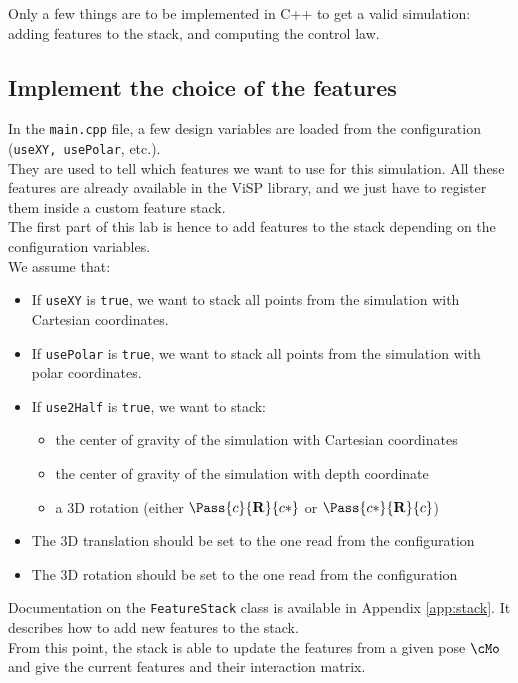 \documentclass{ecnreport}
\begin{document}
Only a few things are to be implemented in C++ to get a valid simulation: adding features to the stack, and computing the control law.

\subsection{Implement the choice of the features}

In the \texttt{main.cpp} file, a few design variables are loaded from the configuration (\texttt{useXY, usePolar}, etc.).\\

They are used to tell which features we want to use for this simulation. All these features are already available in the ViSP library, and we just have to register them inside a custom feature stack.\\

The first part of this lab is hence to add features to the stack depending on the configuration variables.\\
We assume that:
\begin{itemize}
 \item If \texttt{useXY} is \texttt{true}, we want to stack all points from the simulation with Cartesian coordinates.
 \item If \texttt{usePolar} is \texttt{true}, we want to stack all points from the simulation with polar coordinates.
 \item If \texttt{use2Half} is \texttt{true}, we want to stack:
 \begin{itemize}
  \item the center of gravity of the simulation with Cartesian coordinates
  \item the center of gravity of the simulation with depth coordinate
  \item a 3D rotation (either $\Pass{c}{\mathbf{R}}{c*}$ or $\Pass{c*}{\mathbf{R}}{c}$)
 \end{itemize}
 \item The 3D translation should be set to the one read from the configuration
 \item The 3D rotation should be set to the one read from the configuration
\end{itemize}
Documentation on the \texttt{FeatureStack} class is available in Appendix \ref{app:stack}. It describes how to add new features to the stack.\\

From this point, the stack is able to update the features from a given pose $\cMo$ and give the current features and their interaction matrix.
\end{document}
